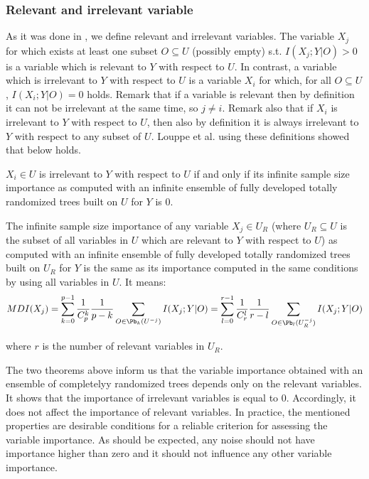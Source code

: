 \subsubsection{Relevant and irrelevant variable}

As it was done in \cite{kohavi1997importance}, we define relevant and irrelevant variables. 
The variable $X_j$ for which exists at least one subset $O \subseteq U$ (possibly empty) 
s.t. $I(X_j;Y|O) > 0$ is a variable which is relevant to $Y$ with respect to $U$. 
In contrast, a variable which is irrelevant to $Y$ with respect to $U$ is a variable $X_i$ for which, for all 
$O \subseteq U$, $I(X_i;Y|O) = 0$ holds. 
Remark that if a variable is relevant then by definition it can not be irrelevant at the same time,
so $j \neq i$. Remark also that if $X_i$ is irrelevant to $Y$ with respect to $U$, 
then also by definition it is always irrelevant to $Y$ with respect to any subset of $U$. 
Louppe et al. using these definitions showed that below holds.

\begin{theorem}
	$X_i \in U$ is irrelevant to $Y$ with respect to $U$ if and only if its infinite sample size
	importance as computed with an infinite ensemble of fully developed totally randomized trees
	built on $U$ for $Y$ is 0.
\end{theorem}

\begin{theorem}
	 The infinite sample size importance of any variable $X_j \in U_R$ (where $U_R \subseteq U$ is the subset of all variables in $U$ which are relevant to $Y$ with respect to $U$) as computed with an infinite ensemble of fully developed totally randomized trees built on $U_R$ for $Y$ is the same as its importance computed in the same conditions by using all variables in $U$. It means:
\begin{equation}
	{MDI}( X_{j} ) = \displaystyle \sum_{k=0}^{p-1}\frac{1}{C^k_p}\frac{1}{p-k} \displaystyle\sum_{O \in \Pb_{k}(U^{-j})} I(X_j;Y|O) = 
	\displaystyle \sum_{l=0}^{r-1}\frac{1}{C^l_r}\frac{1}{r-l} \displaystyle\sum_{O \in \Pb_{l}(U^{-j}_R)} I(X_j;Y|O)
\end{equation}
\end{theorem}
 where $r$ is the number of relevant variables in $U_R$.
 \newline
 
The two theorems above inform us that the variable importance obtained with an ensemble of completelyy 
randomized trees depends only on the relevant variables. 
It shows that the importance of irrelevant variables is equal to $0$. 
Accordingly, it does not affect the importance of relevant variables. 
In practice, the mentioned properties are desirable conditions for a reliable criterion for assessing the variable importance. 
As should be expected, any noise should not have importance higher than zero 
and it should not influence any other variable importance.

